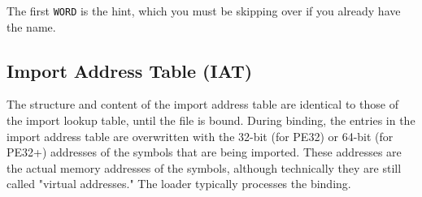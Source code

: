 The first \verb+WORD+ is the hint, which you must be skipping over if you already have the name. 



\subsection{Import Address Table (IAT)}

The structure and content of the import address table are identical to those of the import lookup table, until the file is bound. During binding, the entries in the import address table are overwritten with the 32-bit (for PE32) or 64-bit (for PE32+) addresses of the symbols that are being imported. These addresses are the actual memory addresses of the symbols, although technically they are still called "virtual addresses." The loader typically processes the binding.